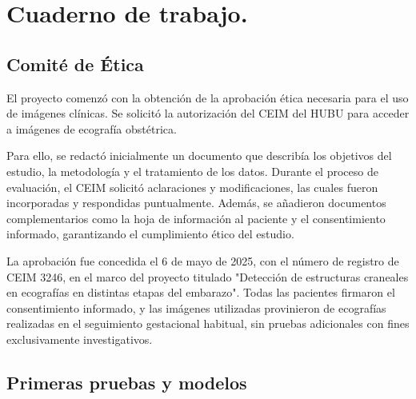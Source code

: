 


\section{Cuaderno de trabajo.}

\subsection{Comité de Ética}
El proyecto comenzó con la obtención de la aprobación ética necesaria para el uso de imágenes clínicas. Se solicitó la autorización del CEIM del HUBU para acceder a imágenes de ecografía obstétrica. 

Para ello, se redactó inicialmente un documento que describía los objetivos del estudio, la metodología y el tratamiento de los datos. Durante el proceso de evaluación, el CEIM solicitó aclaraciones y modificaciones, las cuales fueron incorporadas y respondidas puntualmente. Además, se añadieron documentos complementarios como la hoja de información al paciente y el consentimiento informado, garantizando el cumplimiento ético del estudio.

La aprobación fue concedida el 6 de mayo de 2025, con el número de registro de CEIM 3246, en el marco del proyecto titulado "Detección de estructuras craneales en ecografías en distintas etapas del embarazo". Todas las pacientes firmaron el consentimiento informado, y las imágenes utilizadas provinieron de ecografías realizadas en el seguimiento gestacional habitual, sin pruebas adicionales con fines exclusivamente investigativos.

\subsection{Primeras pruebas y modelos}

